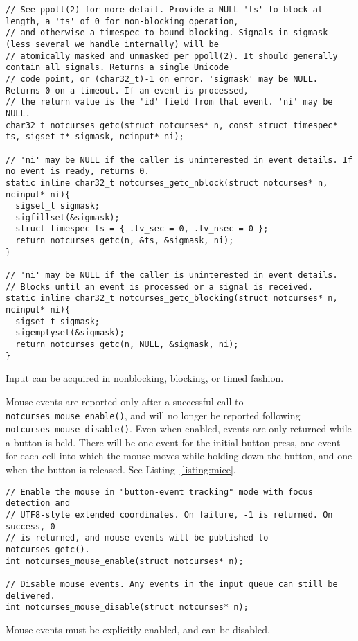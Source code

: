 \begin{listing}[!htb]
\begin{verbatim}
// See ppoll(2) for more detail. Provide a NULL 'ts' to block at length, a 'ts' of 0 for non-blocking operation,
// and otherwise a timespec to bound blocking. Signals in sigmask (less several we handle internally) will be
// atomically masked and unmasked per ppoll(2). It should generally contain all signals. Returns a single Unicode
// code point, or (char32_t)-1 on error. 'sigmask' may be NULL. Returns 0 on a timeout. If an event is processed,
// the return value is the 'id' field from that event. 'ni' may be NULL.
char32_t notcurses_getc(struct notcurses* n, const struct timespec* ts, sigset_t* sigmask, ncinput* ni);

// 'ni' may be NULL if the caller is uninterested in event details. If no event is ready, returns 0.
static inline char32_t notcurses_getc_nblock(struct notcurses* n, ncinput* ni){
  sigset_t sigmask;
  sigfillset(&sigmask);
  struct timespec ts = { .tv_sec = 0, .tv_nsec = 0 };
  return notcurses_getc(n, &ts, &sigmask, ni);
}

// 'ni' may be NULL if the caller is uninterested in event details.
// Blocks until an event is processed or a signal is received.
static inline char32_t notcurses_getc_blocking(struct notcurses* n, ncinput* ni){
  sigset_t sigmask;
  sigemptyset(&sigmask);
  return notcurses_getc(n, NULL, &sigmask, ni);
}
\end{verbatim}
\caption{Input can be acquired in nonblocking, blocking, or timed fashion.}
\label{listing:input}
\end{listing}

Mouse events are reported only after a successful call to
\texttt{notcurses\_mouse\_enable()}, and will no longer be reported following
\texttt{notcurses\_mouse\_disable()}. Even when enabled, events are only
returned while a button is held. There will be one event for the initial button
press, one event for each cell into which the mouse moves while holding down
the button, and one when the button is released. See Listing~\ref{listing:mice}.

\begin{listing}[!htb]
\begin{verbatim}
// Enable the mouse in "button-event tracking" mode with focus detection and
// UTF8-style extended coordinates. On failure, -1 is returned. On success, 0
// is returned, and mouse events will be published to notcurses_getc().
int notcurses_mouse_enable(struct notcurses* n);

// Disable mouse events. Any events in the input queue can still be delivered.
int notcurses_mouse_disable(struct notcurses* n);
\end{verbatim}
\caption{Mouse events must be explicitly enabled, and can be disabled.}
\label{listing:mice}
\end{listing}

